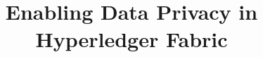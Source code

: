 \documentclass{vldb}
\begin{document}

\title{Enabling Data Privacy in Hyperledger Fabric\vspace{-.1cm}}


%
%
%
%

\end{document}

